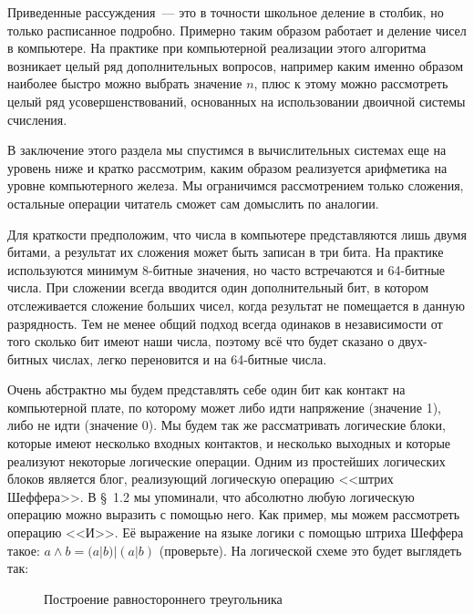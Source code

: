 Приведенные рассуждения~--- это в точности школьное деление в столбик, но только расписанное подробно. Примерно таким образом работает и деление чисел в компьютере. На практике при компьютерной реализации этого алгоритма возникает целый ряд дополнительных вопросов, например каким именно образом наиболее быстро можно выбрать значение $n$, плюс к этому можно рассмотреть целый ряд усовершенствований, основанных на использовании двоичной системы счисления.

В заключение этого раздела мы спустимся в вычислительных системах еще на уровень ниже и кратко рассмотрим, каким образом реализуется арифметика на уровне компьютерного железа. Мы ограничимся рассмотрением только сложения, остальные операции читатель сможет сам домыслить по аналогии.

Для краткости предположим, что числа в компьютере представляются лишь двумя битами, а результат их сложения может быть записан в три бита. На практике используются минимум 8-битные значения, но часто встречаются и 64-битные числа. При сложении всегда вводится один дополнительный бит, в котором отслеживается сложение больших чисел, когда результат не помещается в данную разрядность. Тем не менее общий подход всегда одинаков в независимости от того сколько бит имеют наши числа, поэтому всё что будет сказано о двух-битных числах, легко переновится и на 64-битные числа.

Очень абстрактно мы будем представлять себе один бит как контакт на компьютерной плате, по которому может либо идти напряжение (значение 1), либо не идти (значение 0). Мы будем так же рассматривать логические блоки, которые имеют несколько входных контактов, и несколько выходных и которые реализуют некоторые логические операции. Одним из простейших логических блоков является блог, реализующий логическую операцию <<штрих Шеффера>>. В \S~1.2 мы упоминали, что абсолютно любую логическую операцию можно выразить с помощью него. Как пример, мы можем рассмотреть операцию <<И>>. Её выражение на языке логики с помощью штриха Шеффера такое: $a\land b = (a|b)|(a|b)$ (проверьте). На логической схеме это будет выглядеть так:
\begin{figure}[h]
\centering
{}
\caption{Построение равностороннего треугольника}
\end{figure}
